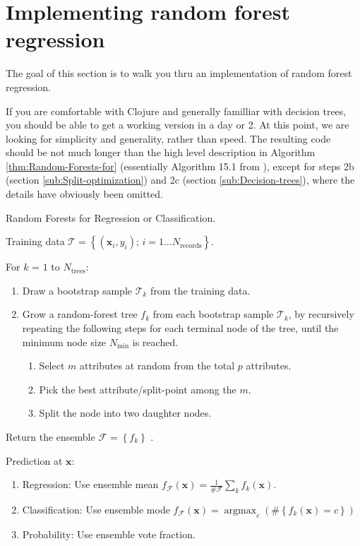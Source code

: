 \documentclass[11pt,openany,american,usenames,dvipsnames,svgnames,x11names,table,isodate]{article}
\numberwithin{equation}{section}
\numberwithin{figure}{section}
\DeclareMathOperator*{\argmax}{argmax}
\begin{document}
\newpage{}

\section{\label{sec:Implementing-random-forest}Implementing random forest
regression}

The goal of this section is to walk you thru an implementation of
random forest regression.

If you are comfortable with Clojure and generally familliar with decision
trees, you should be able to get a working version in a day or 2.
At this point, we are looking for simplicity and generality, rather
than speed. The resulting code should be not much longer than the
high level description in Algorithm \ref{thm:Random-Forests-for}
(essentially Algorithm 15.1 from \cite{hastie-tibshirani-friedman-2009}),
except for steps 2b (section \ref{sub:Split-optimization}) and 2c
(section \ref{sub:Decision-trees}), where the details have obviously
been omitted.
\begin{algorithm}
\label{thm:Random-Forests-for}Random Forests for Regression or Classification. 

Training data $\mathcal{T}=\left\{ (\mathbf{x}_{i},y_{i});\,i=1\ldots N_{\textrm{records}}\right\} $.

For $k$ = $1$ to $N_{\textrm{trees}}$: 
\begin{enumerate}
\item Draw a bootstrap sample $\mathcal{T}_{k}$ from the training data. 
\item Grow a random-forest tree $f_{k}$ from each bootstrap sample $\mathcal{T}_{k}$,
by recursively repeating the following steps for each terminal node
of the tree, until the minimum node size $N_{\min}$ is reached. 

\begin{enumerate}
\item Select $m$ attributes at random from the total $p$ attributes. 
\item Pick the best attribute/split-point among the $m$.
\item Split the node into two daughter nodes. 
\end{enumerate}
\end{enumerate}
Return the ensemble $\mathcal{F}=\left\{ f_{k}\right\} $ . 

Prediction at $\mathbf{x}$: 
\begin{enumerate}
\item Regression: Use ensemble mean 
$f_{\mathcal{F}}(\mathbf{x})=\frac{1}{\#\mathcal{F}}\sum_{k}f_{k}(\mathbf{x})$. 
\item Classification: Use ensemble mode 
$f_{\mathcal{F}}(\mathbf{x})=\argmax_{c}\left(\#\left\{ f_{k}(\mathbf{x})=c\right\} \right)$
\item Probability: Use ensemble vote fraction.
\end{enumerate}
\end{algorithm}
\end{document}
